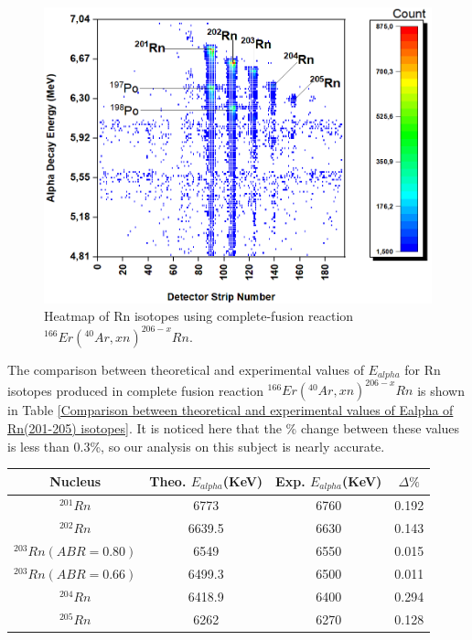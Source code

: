 \documentclass[12pt]{article}
\begin{document}
\begin{figure}[h]
\centering
\includegraphics[scale=0.5]{Heatmap_Rn(201-205).png}
\caption{Heatmap of Rn isotopes using complete-fusion reaction $^{166}Er(^{40}Ar,xn)^{206-x}Rn$.}
\label{Heatmap of Rn(201-205) isotopes.}
\end{figure}

The comparison between theoretical and experimental values of $E_{alpha}$ for Rn isotopes produced in complete fusion reaction $^{166}Er(^{40}Ar,xn)^{206-x}Rn$ is shown in Table \ref{Comparison between theoretical and experimental values of Ealpha of Rn(201-205) isotopes}. It is noticed here that the \% change between these values is less than 0.3\%, so our analysis on this subject is nearly accurate.

\begin{center}
\begin{tabular}{|c|c|c|c|}
\hline
Nucleus & Theo. $E_{alpha}$(KeV) & Exp. $E_{alpha}$(KeV) & $\Delta\%$ \\
\hline
\hline
$^{201}Rn$ & 6773 & 6760 & 0.192 \\
\hline
$^{202}Rn$ & 6639.5 & 6630 & 0.143 \\
\hline
$^{203}Rn(ABR=0.80)$ & 6549 & 6550 & 0.015 \\
\hline
$^{203}Rn(ABR=0.66)$ & 6499.3 & 6500 & 0.011 \\
\hline
$^{204}Rn$ & 6418.9 & 6400 & 0.294 \\
\hline
$^{205}Rn$ & 6262 & 6270 & 0.128 \\
\hline
\end{tabular}
\label{Comparison between theoretical and experimental values of Ealpha of Rn(201-205) isotopes}
\end{center}
\end{document}
